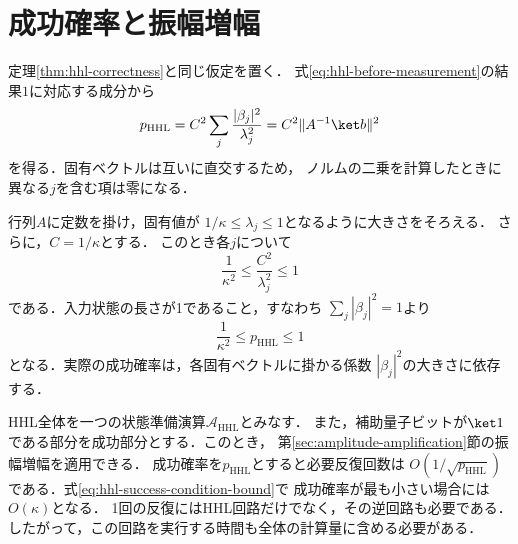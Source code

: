 \section{成功確率と振幅増幅}
\label{sec:hhl-success-probability}

定理\ref{thm:hhl-correctness}と同じ仮定を置く．
式\eqref{eq:hhl-before-measurement}の結果$1$に対応する成分から
\begin{equation}
 p_{\mathrm{HHL}}
 =C^2\sum_j\frac{|\beta_j|^2}{\lambda_j^2}
 =C^2\lVert A^{-1}\ket b\rVert^2
 \label{eq:hhl-general-success-probability}
\end{equation}
を得る．固有ベクトルは互いに直交するため，
ノルムの二乗を計算したときに異なる$j$を含む項は零になる．

行列$A$に定数を掛け，固有値が
$1/\kappa\leq\lambda_j\leq1$となるように大きさをそろえる．
さらに，$C=1/\kappa$とする．
このとき各$j$について
\[
 \frac1{\kappa^2}\leq\frac{C^2}{\lambda_j^2}\leq1
\]
である．入力状態の長さが1であること，すなわち
$\sum_j|\beta_j|^2=1$より
\begin{equation}
 \frac1{\kappa^2}\leq p_{\mathrm{HHL}}\leq1
 \label{eq:hhl-success-condition-bound}
\end{equation}
となる．実際の成功確率は，各固有ベクトルに掛かる係数
$|\beta_j|^2$の大きさに依存する．

HHL全体を一つの状態準備演算$\mathcal A_{\mathrm{HHL}}$とみなす．
また，補助量子ビットが$\ket1$である部分を成功部分とする．このとき，
第\ref{sec:amplitude-amplification}節の振幅増幅を適用できる．
成功確率を$p_{\mathrm{HHL}}$とすると必要反復回数は
$O(1/\sqrt{p_{\mathrm{HHL}}})$である．式\eqref{eq:hhl-success-condition-bound}で
成功確率が最も小さい場合には$O(\kappa)$となる．
1回の反復にはHHL回路だけでなく，その逆回路も必要である．
したがって，この回路を実行する時間も全体の計算量に含める必要がある．

